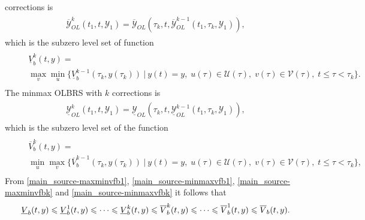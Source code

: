 \documentclass[letterpaper,10pt,english]{sphinxmanual}
\begin{document}
corrections is
\label{main_source:equation-maxminbk}\begin{gather}
\begin{split}\overline{{\mathcal Y}}_{OL}^k(t_1, t, {\mathcal Y}_1) = \overline{{\mathcal Y}}_{OL}(\tau_k, t, \overline{{\mathcal Y}}_{OL}^{k-1}(t_1, \tau_k, {\mathcal Y}_1)),\end{split}\label{main_source-maxminbk}
\end{gather}
which is the subzero level set of function
\label{main_source:equation-maxminvfbk}\begin{gather}
\begin{split}\begin{aligned}
&&\underline{V}^k_b(t, y) = \nonumber \\
&&\max_v\min_u\{\underline{V}^{k-1}_b(\tau_k, y(\tau_k)) ~|~
y(t)=y, \; u(\tau)\in{\mathcal U}(\tau), \;
v(\tau)\in{\mathcal V}(\tau), \; t\leqslant\tau<\tau_k\}.
\end{aligned}\end{split}\label{main_source-maxminvfbk}
\end{gather}
The minmax OLBRS with $k$ corrections is
\label{main_source:equation-minmaxbk}\begin{gather}
\begin{split}\underline{{\mathcal Y}}_{OL}^k(t_1, t, {\mathcal Y}_1) = \underline{{\mathcal Y}}_{OL}(\tau_k, t, \underline{{\mathcal Y}}_{OL}^{k-1}(t_1, \tau_k, {\mathcal Y}_1)),\end{split}\label{main_source-minmaxbk}
\end{gather}
which is the subzero level set of the function
\label{main_source:equation-minmaxvfbk}\begin{gather}
\begin{split}\begin{aligned}
&&\overline{V}^k_b(t, y) = \nonumber \\
&&\min_u\max_v\{\overline{V}^{k-1}_b(\tau_k, y(\tau_k)) ~|~
y(t)=y, \; u(\tau)\in{\mathcal U}(\tau), \;
v(\tau)\in{\mathcal V}(\tau), \; t\leqslant\tau<\tau_k\},
\end{aligned}\end{split}\label{main_source-minmaxvfbk}
\end{gather}
From \eqref{main_source-maxminvfb1}, \eqref{main_source-minmaxvfb1}, \eqref{main_source-maxminvfbk} and \eqref{main_source-minmaxvfbk}
it follows that
\begin{gather}
\begin{split}\underline{V}_b(t, y) \leqslant\underline{V}^1_b(t, y)\leqslant\cdots
\leqslant\underline{V}^k_b(t, y) \leqslant\overline{V}^k_b(t, y) \leqslant\cdots
\leqslant\overline{V}^1_b(t, y) \leqslant\overline{V}_b(t, y) .\end{split}\notag
\end{gather}
\end{document}
